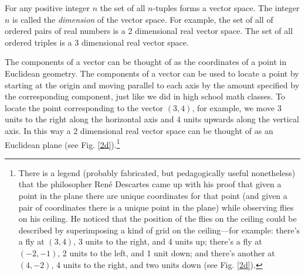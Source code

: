    For any positive integer $n$ the set of all $n$-tuples forms a vector space.
The integer $n$ is called the {\em dimension} of the vector space. For 
example, the set of all of ordered pairs of real numbers is a 2 dimensional 
real vector space. The set of all ordered triples is a 3 dimensional real 
vector space. 

   The components of a vector can be thought of as the coordinates of a point
in Euclidean geometry. The components of a vector can be used to locate a
point by starting at the origin and moving parallel to each axis by the 
amount specified by the corresponding component, just like we did in high 
school math classes. To locate the point corresponding to the vector 
$(3,4)$, for example, we move $3$ units to the right along the 
horizontal axis and $4$ units upwards along the vertical axis. In this way a 
2 dimensional real vector space can be thought of as an Euclidean plane (see 
Fig. \ref{2d}).\footnote{There is a legend (probably fabricated, but pedagogically useful nonetheless) 
that the philosopher Ren{\'{e}} Descartes 
 came up with his proof that given a point in the plane there are unique coordinates for that 
 point (and given a pair of coordinates there is a unique point in the plane) 
 while observing flies on his ceiling. He 
 noticed that the position of the flies on the ceiling could be described by 
 superimposing a kind of grid on the ceiling---for example: there's a fly at 
 $(3,4)$, 3 units to the right, and 4 units up; there's a fly at 
 $(-2,-1)$, 2 units to the left, and 1 unit down; and there's another at 
 $(4,-2)$, 4 units to the right, and two units down (see Fig. \ref{2d}).} 


